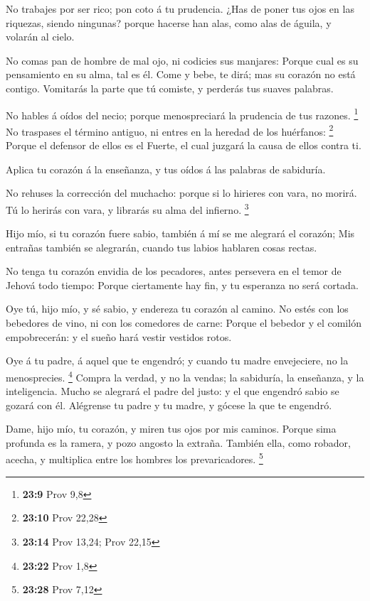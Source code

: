  No trabajes por ser rico; pon coto á tu prudencia.
 ¿Has de poner tus ojos en las riquezas, siendo ningunas?
porque hacerse han alas, como alas de águila, y volarán al cielo.

 No comas pan de hombre de mal ojo, ni codicies sus
manjares:  Porque cual es su pensamiento en su alma, tal es
él. Come y bebe, te dirá; mas su corazón no está contigo. 
Vomitarás la parte que tú comiste, y perderás tus suaves palabras.

 No hables á oídos del necio; porque menospreciará la
prudencia de tus razones. \footnote{\textbf{23:9} Prov 9,8}
 No traspases el término antiguo, ni entres en la heredad
de los huérfanos: \footnote{\textbf{23:10} Prov 22,28} 
Porque el defensor de ellos es el Fuerte, el cual juzgará la causa de
ellos contra ti.

 Aplica tu corazón á la enseñanza, y tus oídos á las
palabras de sabiduría.

 No rehuses la corrección del muchacho: porque si lo
hirieres con vara, no morirá.  Tú lo herirás con vara, y
librarás su alma del infierno. \footnote{\textbf{23:14} Prov 13,24; Prov
  22,15}

 Hijo mío, si tu corazón fuere sabio, también á mí se me
alegrará el corazón;  Mis entrañas también se alegrarán,
cuando tus labios hablaren cosas rectas.

 No tenga tu corazón envidia de los pecadores, antes
persevera en el temor de Jehová todo tiempo:  Porque
ciertamente hay fin, y tu esperanza no será cortada.

 Oye tú, hijo mío, y sé sabio, y endereza tu corazón al
camino.  No estés con los bebedores de vino, ni con los
comedores de carne:  Porque el bebedor y el comilón
empobrecerán: y el sueño hará vestir vestidos rotos.

 Oye á tu padre, á aquel que te engendró; y cuando tu madre
envejeciere, no la menosprecies. \footnote{\textbf{23:22} Prov 1,8}
 Compra la verdad, y no la vendas; la sabiduría, la
enseñanza, y la inteligencia.  Mucho se alegrará el padre
del justo: y el que engendró sabio se gozará con él. 
Alégrense tu padre y tu madre, y gócese la que te engendró.

 Dame, hijo mío, tu corazón, y miren tus ojos por mis
caminos.  Porque sima profunda es la ramera, y pozo angosto
la extraña.  También ella, como robador, acecha, y
multiplica entre los hombres los prevaricadores. \footnote{\textbf{23:28}
  Prov 7,12}

